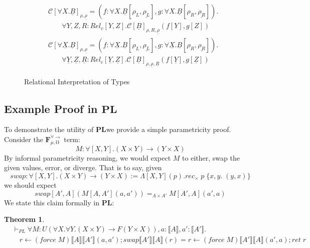 \documentclass[acmsmall]{acmart}
\newcommand{\den}[1]{\llbracket #1\rrbracket}
\newcommand{\source}{$\mathbf{F}_{\mu,\mho}^{\forall\to}\;$}
\newcommand{\pl}{$\mathbf{PL}$}
\newtheorem*{theorem*}{Theorem}
\begin{document}
\begin{figure}[!htbp]
\begin{align*}
    &\mathcal{C}[\forall X. \underline{B}]_{\rho,\underline{\rho}} = (f : \forall X.\underline{B}[\rho_L,\underline{\rho_L}],g : \forall X.\underline{B}[\rho_R,\underline{\rho_R}]). \\&\;\;\;\;\;\;\;
    \forall Y,Z,R:Rel_v[Y,Z]. \mathcal{C}[\underline{B}]_{\rho,R,\underline{\rho}}(f[Y],g[Z])
    \\
    &\mathcal{C}[\forall \underline{X}.\underline{B}]_{\rho,\underline{\rho}} = (f : \forall \underline{X}.\underline{B}[\rho_L,\underline{\rho_L}],g : \forall \underline{X}.\underline{B}[\rho_R,\underline{\rho_R}]). \\&\;\;\;\;\;\;\;
    \forall \underline{Y},\underline{Z},\underline{R}:Rel_c[\underline{Y},\underline{Z}]. \mathcal{C}[\underline{B}]_{\rho,\underline{\rho},\underline{R}}(f[\underline{Y}],g[\underline{Z}])
    \end{align*}
    \caption{Relational Interpretation of Types}
  \label{fig:RelInterp}
\end{figure}
\subsection{Example Proof in \pl}
To demonstrate the utility of \pl\;we provide a simple parametricity proof. Consider the \source term:
\[
  M : \forall [X,Y].(X \times Y) \to (Y\times X)
\]
By informal parametricity reasoning, we would expect $M$ to either, swap the given values, error, or diverge. That is to say, given 
\[
  swap : \forall[X,Y].(X \times Y) \to (Y \times X) := \Lambda [X,Y](p).rec_\times\;p\;\{x,y.\; (y,x)\}  
\]
we should expect 
\[
  swap[A',A](M[A,A'](a,a')) =_{A\times A'} M[A',A](a',a)
\]
We state this claim formally in \pl:
\begin{theorem*}
\begin{align*} 
&\vdash_{PL}\forall M : U(\forall X.\forall Y. (X\times Y) \to F(Y \times X)),a:\den{A},a':\den{A'}.   \\
& \quad r \leftarrow (force\;M)\den{A}\den{A'}(a,a');swap\den{A'}\den{A}(r) = r \leftarrow (force\;M)\den{A'}\den{A}(a',a);ret\;r
\end{align*}
\end{theorem*}
\end{document}
